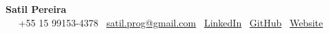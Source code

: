 \begin{center}
  {\LARGE \textbf{Satil Pereira}} \\
  \vspace{0.25em}
  \faMapMarker\  \hspace{0.75em}
  \faPhone\ +55 15 99153-4378 \hspace{0.75em}
  \faEnvelope\ \href{mailto:satil.prog@gmail.com}{satil.prog@gmail.com} \hspace{0.75em}
  \faLinkedin\ \href{https://linkedin.com/in/myprofile}{LinkedIn} \hspace{0.75em}
  \faGithub\ \href{https://github.com/satilpereira}{GitHub} \hspace{0.75em}
  \faGlobe\ \href{https://satil.me}{Website}
\end{center}
\vspace{-1em}
